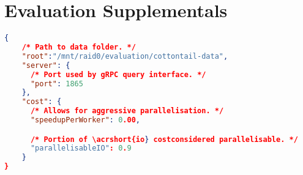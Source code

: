 \chapter{Evaluation Supplementals}
\label{chapter:appendix_supplementals}


\begin{lstlisting}[language=json, caption={Cottontail DB configuration used during the entire evaluation (config.json).}, label=listing:cottontail_config, numbers=none]
{
    /* Path to data folder. */
    "root":"/mnt/raid0/evaluation/cottontail-data",
    "server": {
      /* Port used by gRPC query interface. */
      "port": 1865
    },
    "cost": {
      /* Allows for aggressive parallelisation. */
      "speedupPerWorker": 0.00,  

      /* Portion of \acrshort{io} costconsidered parallelisable. */
      "parallelisableIO": 0.9
    }
} 
\end{lstlisting}

\newpage

